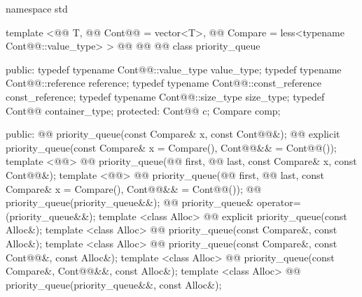 \documentclass[american,twoside]{book}
\begin{document}
\begin{codeblock}
namespace std {
  template <@@ T, @@ Cont@@ = vector<T>,
            @@ Compare = less<typename Cont@@::value_type> >
  @@
        @@
        @@
  class priority_queue { 
  public:
    typedef typename Cont@@::value_type            value_type;
    typedef typename Cont@@::reference             reference;
    typedef typename Cont@@::const_reference       const_reference;
    typedef typename Cont@@::size_type             size_type;
    typedef          Cont@@                        container_type;
  protected:
    Cont@@ c;
    Compare comp;

  public:
    @@ priority_queue(const Compare& x, const Cont@@&);
    @@ 
      explicit priority_queue(const Compare& x = Compare(), Cont@@&& = Cont@@());
    template <@@>
      @@
      priority_queue(@@ first, @@ last,
             const Compare& x, const Cont@@&);
    template <@@>
      @@
      priority_queue(@@ first, @@ last,
             const Compare& x = Compare(), Cont@@&& = Cont@@());
    @@ priority_queue(priority_queue&&);
    @@ priority_queue& operator=(priority_queue&&);
    template <class Alloc> 
      @@
      explicit priority_queue(const Alloc&);
    template <class Alloc> 
      @@
      priority_queue(const Compare&, const Alloc&);
    template <class Alloc> 
      @@
      priority_queue(const Compare&, const Cont@@&, const Alloc&);
    template <class Alloc> 
      @@
      priority_queue(const Compare&, Cont@@&&, const Alloc&);
    template <class Alloc> 
      @@
      priority_queue(priority_queue&&, const Alloc&);

}}
\end{codeblock}
\end{document}
